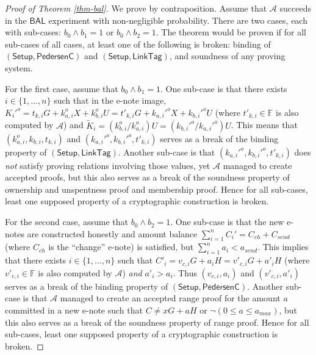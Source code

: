 \documentclass{article}
\begin{document}
\begin{proof}[Proof of Theorem \ref{thm-bal}]
We prove by contraposition. Assume that $\mathcal{A}$ succeeds in the $\textsf{BAL}$ experiment with non-negligible probability. There are two cases, each with sub-cases: $b_0 \wedge b_1 = 1$ or $b_0 \wedge b_2 = 1$. The theorem would be proven if for all sub-cases of all cases, at least one of the following is broken: binding of $(\textsf{Setup},\textsf{PedersenC})$ and $(\textsf{Setup}, \textsf{LinkTag})$, and soundness of any proving system.

For the first case, assume that $b_0 \wedge b_1 = 1$. One sub-case is that there exists $i\in\{1,\ldots,n\}$ such that in the e-note image, $K_i'^o = t_{k,i} G + k_{a,i}^o X + k_{b,i}^o U = t'_{k,i} G + k_{a,i}'^o X + k_{b,i}'^o U$ (where $t'_{k,i}\in\mathbb{F}$ is also computed by $\mathcal{A}$) and $\tilde{K}_i = (k_{b,i}^o/k_{a,i}^o)U = (k_{b,i}'^o/k_{a,i}'^o)U$. This means that $(k_{a,i}^o, k_{b,i}, t_{k,i})$ and $( k_{a,i}'^o, k_{b,i}'^o, t'_{k,i})$ serves as a break of the binding property of $(\textsf{Setup}, \textsf{LinkTag})$. Another sub-case is that $( k_{a,i}'^o, k_{b,i}'^o, t'_{k,i})$ does \textit{not} satisfy proving relations involving those values, yet $\mathcal{A}$ managed to create accepted proofs, but this also serves as a break of the soundness property of ownership and unspentness proof and membership proof. Hence for all sub-cases, least one supposed property of a cryptographic construction is broken.

For the second case, assume that $b_0 \wedge b_2 = 1$. One sub-case is that the new e-notes are constructed honestly and amount balance $\sum_{i=1}^n{C_i'}=C_{ch}+C_{send}$ (where $C_{ch}$ is the ``change'' e-note) is satisfied, but $\sum_{i=1}^n{a_i} < a_{send}$. This implies that there exists $i\in\{1,\ldots,n\}$ such that $C'_i = v_{c,i} G + a_i H = v'_{c,i} G + a'_i H$ (where $v'_{c,i}\in\mathbb{F}$ is also computed by $\mathcal{A}$) \textit{and} $a'_i > a_i$. Thus $( v_{c,i}, a_i)$ and $(v'_{c,i}, a'_i)$ serves as a break of the binding property of $(\textsf{Setup}, \textsf{PedersenC})$. Another sub-case is that $\mathcal{A}$ managed to create an accepted range proof for the amount $a$ committed in a new e-note such that $C \ne x G + a H$ or $\neg (0 \le a \le a_{max})$, but this also serves as a break of the soundness property of range proof. Hence for all sub-cases, least one supposed property of a cryptographic construction is broken.
\end{proof}
\end{document}
